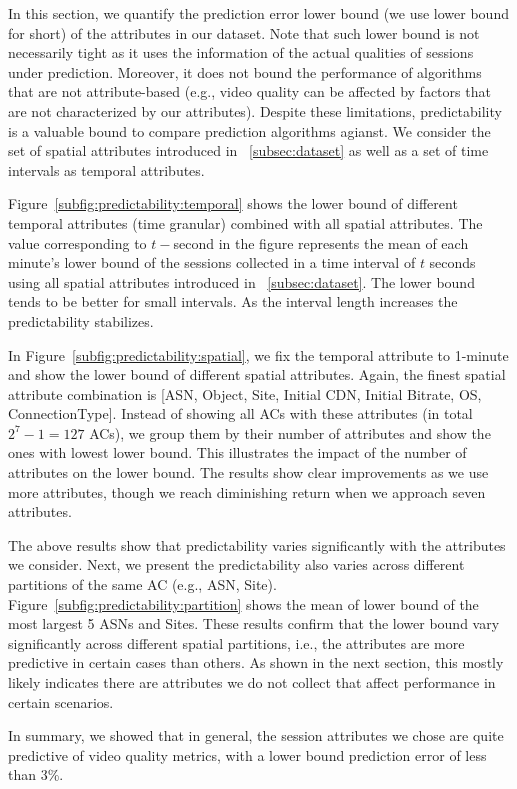 

In this section, we quantify the prediction error lower bound (we use lower bound for short) of the attributes in our dataset. Note that such lower bound is not necessarily tight as it uses the information of the actual qualities of sessions under prediction. Moreover, it does not bound the performance of algorithms that are not attribute-based (e.g., video quality can be affected by factors that are not characterized by our attributes).
Despite these limitations, predictability is a valuable bound to compare prediction algorithms agianst. We consider the set of spatial attributes introduced in \Section~\ref{subsec:dataset} as well as a set of time intervals as temporal attributes.

 Figure~\ref{subfig:predictability:temporal} shows the lower bound of different temporal attributes (time granular) combined with all spatial attributes. The value corresponding to $t-$second in the figure represents the mean of each minute's lower bound of the sessions collected in a time interval of $t$ seconds using all spatial attributes introduced in \Section~\ref{subsec:dataset}.  The lower bound tends to be better for small intervals. As the interval length increases the predictability stabilizes. 

 In Figure~\ref{subfig:predictability:spatial}, we fix the temporal attribute to 1-minute and show the lower bound of different spatial attributes. Again, the finest spatial attribute combination is [ASN, Object, Site, Initial CDN, Initial Bitrate, OS, ConnectionType].  Instead of showing all ACs with these attributes (in total $2^7-1=127$ ACs), we group them by their number of attributes and show the ones with lowest lower bound. This illustrates the impact of the number of attributes on the lower bound. The results show clear improvements as we use more attributes, though we reach diminishing return when we approach seven attributes.

 The above results show that predictability varies significantly with the attributes we consider. Next, we present the predictability also varies across different partitions of the same AC (e.g., ASN, Site). Figure~\ref{subfig:predictability:partition} shows the mean of lower bound of the most largest 5 ASNs and Sites. These results confirm that the lower bound vary significantly across different spatial partitions, i.e., the attributes are more predictive in certain cases than others. As shown in the next section, this mostly likely indicates there are attributes we do not collect that affect performance in certain scenarios. 


In summary, we showed that in general, the session attributes we chose are quite predictive of video quality metrics, with a lower bound prediction error of less than 3\%.


